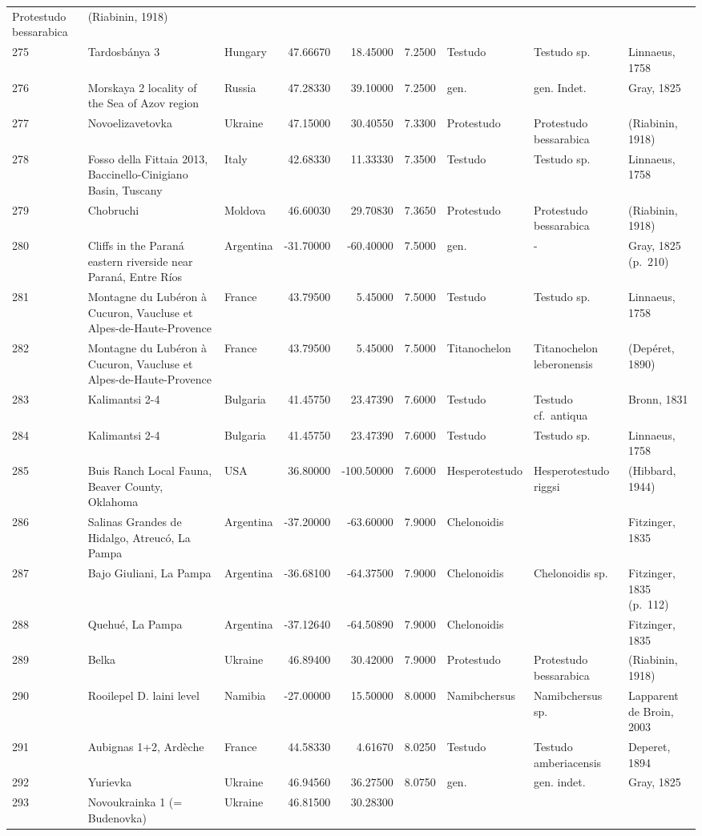 \documentclass[]{article}
\begin{document}
\begin{longtable}[]{@{}lllrrrlll@{}}
Protestudo bessarabica & (Riabinin, 1918)\tabularnewline
275 & Tardosbánya 3 & Hungary & 47.66670 & 18.45000 & 7.2500 & Testudo &
Testudo sp. & Linnaeus, 1758\tabularnewline
276 & Morskaya 2 locality of the Sea of Azov region & Russia & 47.28330
& 39.10000 & 7.2500 & gen. & gen. Indet. & Gray, 1825\tabularnewline
277 & Novoelizavetovka & Ukraine & 47.15000 & 30.40550 & 7.3300 &
Protestudo & Protestudo bessarabica & (Riabinin, 1918)\tabularnewline
278 & Fosso della Fittaia 2013, Baccinello-Cinigiano Basin, Tuscany &
Italy & 42.68330 & 11.33330 & 7.3500 & Testudo & Testudo sp. & Linnaeus,
1758\tabularnewline
279 & Chobruchi & Moldova & 46.60030 & 29.70830 & 7.3650 & Protestudo &
Protestudo bessarabica & (Riabinin, 1918)\tabularnewline
280 & Cliffs in the Paraná eastern riverside near Paraná, Entre Ríos &
Argentina & -31.70000 & -60.40000 & 7.5000 & gen. & - & Gray, 1825
(p.~210)\tabularnewline
281 & Montagne du Lubéron à Cucuron, Vaucluse et Alpes-de-Haute-Provence
& France & 43.79500 & 5.45000 & 7.5000 & Testudo & Testudo sp. &
Linnaeus, 1758\tabularnewline
282 & Montagne du Lubéron à Cucuron, Vaucluse et Alpes-de-Haute-Provence
& France & 43.79500 & 5.45000 & 7.5000 & Titanochelon & Titanochelon
leberonensis & (Depéret, 1890)\tabularnewline
283 & Kalimantsi 2-4 & Bulgaria & 41.45750 & 23.47390 & 7.6000 & Testudo
& Testudo cf.~antiqua & Bronn, 1831\tabularnewline
284 & Kalimantsi 2-4 & Bulgaria & 41.45750 & 23.47390 & 7.6000 & Testudo
& Testudo sp. & Linnaeus, 1758\tabularnewline
285 & Buis Ranch Local Fauna, Beaver County, Oklahoma & USA & 36.80000 &
-100.50000 & 7.6000 & Hesperotestudo & Hesperotestudo riggsi & (Hibbard,
1944)\tabularnewline
286 & Salinas Grandes de Hidalgo, Atreucó, La Pampa & Argentina &
-37.20000 & -63.60000 & 7.9000 & Chelonoidis & & Fitzinger,
1835\tabularnewline
287 & Bajo Giuliani, La Pampa & Argentina & -36.68100 & -64.37500 &
7.9000 & Chelonoidis & Chelonoidis sp. & Fitzinger, 1835
(p.~112)\tabularnewline
288 & Quehué, La Pampa & Argentina & -37.12640 & -64.50890 & 7.9000 &
Chelonoidis & & Fitzinger, 1835\tabularnewline
289 & Belka & Ukraine & 46.89400 & 30.42000 & 7.9000 & Protestudo &
Protestudo bessarabica & (Riabinin, 1918)\tabularnewline
290 & Rooilepel D. laini level & Namibia & -27.00000 & 15.50000 & 8.0000
& Namibchersus & Namibchersus sp. & Lapparent de Broin,
2003\tabularnewline
291 & Aubignas 1+2, Ardèche & France & 44.58330 & 4.61670 & 8.0250 &
Testudo & Testudo amberiacensis & Deperet, 1894\tabularnewline
292 & Yurievka & Ukraine & 46.94560 & 36.27500 & 8.0750 & gen. & gen.
indet. & Gray, 1825\tabularnewline
293 & Novoukrainka 1 (= Budenovka) & Ukraine & 46.81500 & 30.28300 &

\end{longtable}
\end{document}
